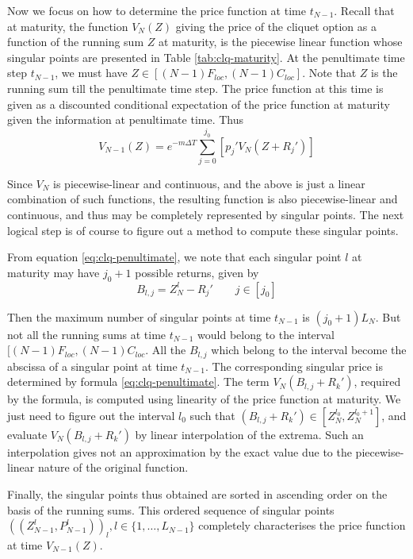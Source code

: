 Now we focus on how to determine the price function at time $ t_{N - 1} $. Recall that at maturity, the function $ V_{N}(Z) $ giving the price of the cliquet option as a function of the running sum $ Z $ at maturity, is the piecewise linear function whose singular points are presented in Table \ref{tab:clq-maturity}. At the penultimate time step $ t_{N - 1} $, we must have $ Z \in [ (N-1) F_{loc}, (N-1) C_{loc} ] $. Note that $ Z $ is the running sum till the penultimate time step. The price function at this time is given as a discounted conditional expectation of the price function at maturity given the information at penultimate time. Thus
\begin{equation}
	\label{eq:clq-penultimate}
	V_{N-1} (Z) = e^{- m \Delta T} \sum_{j=0}^{j_0} \left[ p_j' V_{N} (Z + R_j') \right]
\end{equation}

Since $ V_{N} $ is piecewise-linear and continuous, and the above is just a linear combination of such functions, the resulting function is also piecewise-linear and continuous, and thus may be completely represented by singular points. The next logical step is of course to figure out a method to compute these singular points.

From equation \ref{eq:clq-penultimate}, we note that each singular point $ l $ at maturity may have $ j_0 + 1 $ possible returns, given by
\begin{equation}
	\label{eq:clq-b}
	B_{l,j} = Z_N^l - R_j' \qquad j \in [j_0]
\end{equation}

Then the maximum number of singular points at time $ t_{N-1} $ is $ ( j_0 + 1 ) L_N $. But not all the running sums at time $ t_{N-1} $ would belong to the interval $ [ (N-1) F_{loc}, (N-1) C_{loc} $. All the $ B_{l,j} $ which belong to the interval become the abscissa of a singular point at time $ t_{N-1} $. The corresponding singular price is determined by formula \ref{eq:clq-penultimate}. The term $ V_{N} (B_{l,j} + R_k') $, required by the formula, is computed using linearity of the price function at maturity. We just need to figure out the interval $ l_0 $ such that $ ( B_{l,j} + R_k' ) \in [ Z_N^{l_0}, Z_N^{l_0 + 1} ] $, and evaluate $ V_{N} (B_{l,j} + R_k') $ by linear interpolation of the extrema. Such an interpolation gives not an approximation by the exact value due to the piecewise-linear nature of the original function.

Finally, the singular points thus obtained are sorted in ascending order on the basis of the running sums. This ordered sequence of singular points $ ( ( Z_{N-1}^l, P_{N-1}^l ) )_l , l \in \{ 1, \dots, L_{N-1} \} $ completely characterises the price function at time $ V_{N-1}(Z) $.



